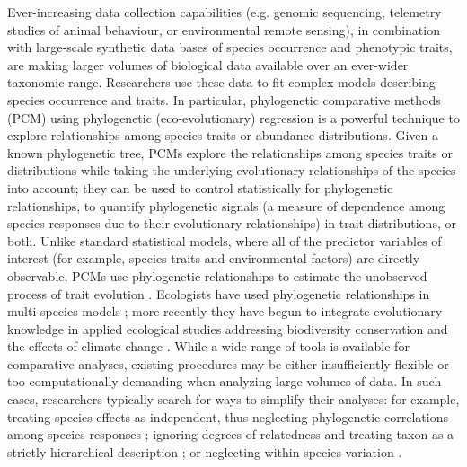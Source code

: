 \documentclass[12pt]{article}
\begin{document}
Ever-increasing data collection capabilities (e.g. genomic sequencing, telemetry studies of animal behaviour, or environmental remote sensing), in combination with large-scale synthetic data bases of species occurrence and phenotypic traits, are making larger volumes of biological data available over an ever-wider taxonomic range.
Researchers use these data to fit complex models describing species occurrence and traits.
In particular, phylogenetic comparative methods (PCM) using phylogenetic (eco-evolutionary) regression \citep{hansen2012interpreting} is a powerful technique to explore relationships among species traits or abundance distributions.
Given a known phylogenetic tree, PCMs explore the relationships among species traits or distributions while taking the underlying evolutionary relationships of the species into account; they can be used to control statistically for phylogenetic relationships, to quantify phylogenetic signals (a measure of dependence among species responses due to their evolutionary relationships) in trait distributions, or both.
Unlike standard statistical models, where all of the predictor variables of interest (for example, species traits and environmental factors) are directly observable,  PCMs use phylogenetic relationships to estimate the unobserved process of trait evolution \citep{felsenstein1985phylogenies, butler2004phylogenetic}. 
Ecologists have used phylogenetic relationships in multi-species models \citep{garland1992procedures, freckleton2002phylogenetic, ord2010adaptation, davies2013phylogenetic}; more recently they have begun to integrate evolutionary knowledge in applied ecological studies addressing biodiversity conservation and the effects of climate change \citep{winter2013phylogenetic, santamaria2012evolution, lankau2011incorporating, lavergne2010biodiversity, mace2008evolutionary}.
While a wide range of tools is available for comparative analyses, existing procedures may be either insufficiently flexible or too computationally demanding when analyzing large volumes of data.
In such cases, researchers typically search for ways to simplify their analyses: for example, treating species effects as independent, thus neglecting phylogenetic correlations among species responses \citep{bunnefeld2012island}; ignoring degrees of relatedness and treating taxon as a strictly hierarchical description \citep{tella1999habitat}; or neglecting within-species variation \citep{ord2010adaptation}.
\end{document}
